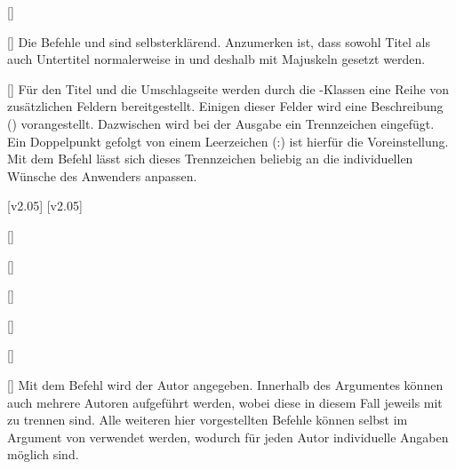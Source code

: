 \begin{Declaration*}{}
\begin{Declaration*}{}
\begin{Declaration*}{}
\begin{Declaration}{[]}
\begin{Declaration}{[]}
\printdeclarationlist%
%
%
Die Befehle  und  sind selbsterklärend. Anzumerken 
ist, dass sowohl Titel als auch Untertitel normalerweise in \DIN und deshalb 
mit Majuskeln gesetzt werden. 
\end{Declaration}
\end{Declaration}

\begin{Declaration}{[]}
\printdeclarationlist%
%
%
Für den Titel und die Umschlagseite werden durch die \TUDScript-Klassen eine 
Reihe von zusätzlichen Feldern bereitgestellt. Einigen dieser Felder wird eine 
Beschreibung () vorangestellt. Dazwischen 
wird bei der Ausgabe ein Trennzeichen eingefügt. Ein Doppelpunkt gefolgt von 
einem Leerzeichen (:) ist hierfür die Voreinstellung. Mit 
dem Befehl  lässt sich dieses Trennzeichen beliebig an 
die individuellen Wünsche des Anwenders anpassen.
\end{Declaration}

[v2.05]
[v2.05]
\begin{Declaration}{[]}
\begin{Declaration}{[]}
\begin{Declaration}{[]}
\begin{Declaration}{[]}
\begin{Declaration}{[]}
\begin{Declaration}{[]}
\printdeclarationlist%
%
%
%
Mit dem Befehl  wird der Autor angegeben. Innerhalb des 
Argumentes können auch mehrere Autoren aufgeführt werden, wobei diese in diesem 
Fall jeweils mit  zu trennen sind. Alle weiteren hier vorgestellten 
Befehle können selbst im Argument von  verwendet werden, wodurch 
für jeden Autor individuelle Angaben möglich sind.


\end{Declaration}
\end{Declaration}
\end{Declaration}
\end{Declaration}
\end{Declaration}
\end{Declaration}
\end{Declaration*}
\end{Declaration*}
\end{Declaration*}
